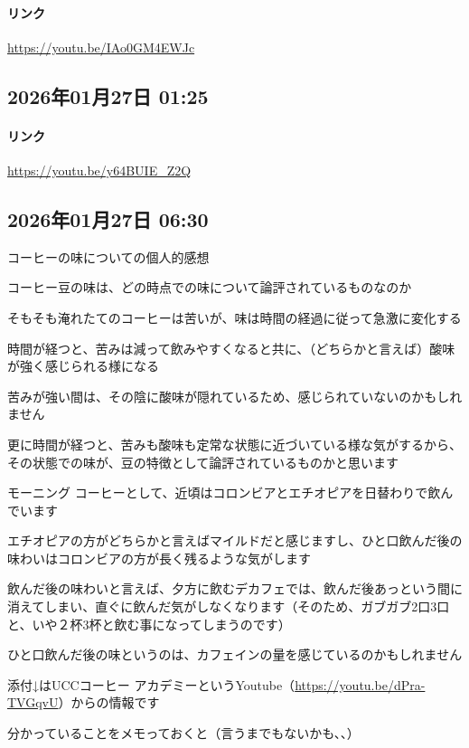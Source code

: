 \paragraph{リンク}
\url{https://youtu.be/IAo0GM4EWJc}

\subsection*{2026年01月27日 01:25}

\paragraph{リンク}
\url{https://youtu.be/y64BUIE_Z2Q}

\subsection*{2026年01月27日 06:30}

コーヒーの味についての個人的感想

コーヒー豆の味は、どの時点での味について論評されているものなのか

そもそも淹れたてのコーヒーは苦いが、味は時間の経過に従って急激に変化する

時間が経つと、苦みは減って飲みやすくなると共に、（どちらかと言えば）酸味が強く感じられる様になる

苦みが強い間は、その陰に酸味が隠れているため、感じられていないのかもしれません

更に時間が経つと、苦みも酸味も定常な状態に近づいている様な気がするから、その状態での味が、豆の特徴として論評されているものかと思います

モーニング コーヒーとして、近頃はコロンビアとエチオピアを日替わりで飲んでいます

エチオピアの方がどちらかと言えばマイルドだと感じますし、ひと口飲んだ後の味わいはコロンビアの方が長く残るような気がします

飲んだ後の味わいと言えば、夕方に飲むデカフェでは、飲んだ後あっという間に消えてしまい、直ぐに飲んだ気がしなくなります（そのため、ガブガブ2口3口と、いや２杯3杯と飲む事になってしまうのです）

ひと口飲んだ後の味というのは、カフェインの量を感じているのかもしれません

添付↓はUCCコーヒー アカデミーというYoutube（\url{https://youtu.be/dPra-TVGqvU}）からの情報です

分かっていることをメモっておくと（言うまでもないかも、、）

